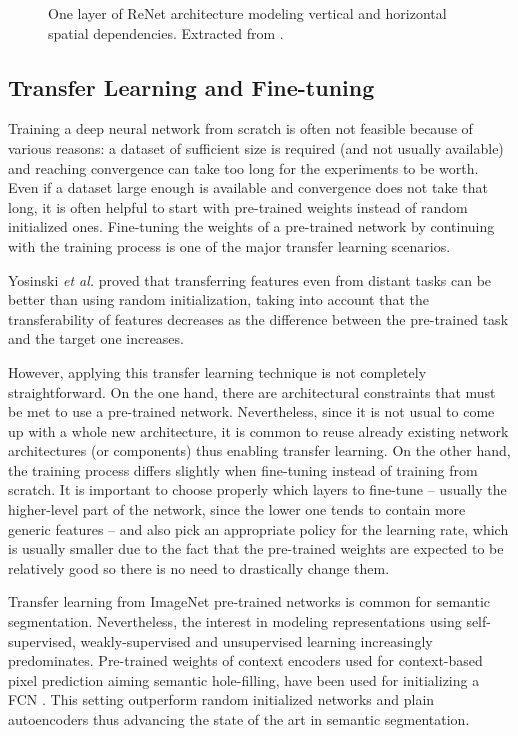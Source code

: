 \begin{figure}[!hbt]
	\centering
	\caption{One layer of ReNet architecture modeling vertical and horizontal spatial dependencies. Extracted from \cite{Visin2015}.}
	\label{fig:renet}
\end{figure}

\subsection{Transfer Learning and Fine-tuning}

Training a deep neural network from scratch is often not feasible because of various reasons: a dataset of sufficient size is required (and not usually available) and reaching convergence can take too long for the experiments to be worth. Even if a dataset large enough is available and convergence does not take that long, it is often helpful to start with pre-trained weights instead of random initialized ones\cite{Ahmed2008}\cite{Oquab2014}. Fine-tuning the weights of a pre-trained network by continuing with the training process is one of the major transfer learning scenarios.

Yosinski \emph{et al.}\cite{Yosinski2014} proved that transferring features even from distant tasks can be better than using random initialization, taking into account that the transferability of features decreases as the difference between the pre-trained task and the target one increases.

However, applying this transfer learning technique is not completely straightforward. On the one hand, there are architectural constraints that must be met to use a pre-trained network. Nevertheless, since it is not usual to come up with a whole new architecture, it is common to reuse already existing network architectures (or components) thus enabling transfer learning. On the other hand, the training process differs slightly when fine-tuning instead of training from scratch. It is important to choose properly which layers to fine-tune -- usually the higher-level part of the network, since the lower one tends to contain more generic features -- and also pick an appropriate policy for the learning rate, which is usually smaller due to the fact that the pre-trained weights are expected to be relatively good so there is no need to drastically change them.

Transfer learning from ImageNet pre-trained networks is common for semantic segmentation. Nevertheless, the interest in modeling representations using self-supervised, weakly-supervised and unsupervised learning increasingly predominates. Pre-trained weights of context encoders used for context-based pixel prediction aiming semantic hole-filling, have been used for initializing a \acs{FCN} \cite{Pathak2016}. This setting outperform random initialized networks and plain autoencoders thus advancing the state of the art in semantic segmentation.

